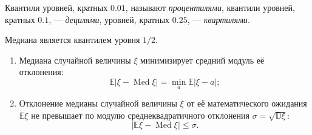 \begin{defn}
    Квантили уровней, кратных $0.01$, называют {\it процентилями}, квантили уровней, кратных $0.1$, — {\it децилями}, уровней, кратных $0.25$, — {\it квартилями}.
\end{defn} 

\begin{rmrk}
    Медиана является квантилем уровня $1 / 2$.
\end{rmrk} 

\begin{namedthm}\leavevmode
\begin{enumerate}
    \item Медиана случайной величины $\xi$ минимизирует средний модуль её отклонения:
    \begin{equation*}
        \mathbb{E}|\xi - \operatorname{Med} \xi| 
    = \min _{a} \mathbb{E}|\xi-a|;
    \end{equation*}
    \item Отклонение медианы случайной величины $\xi$ от её математического ожидания $\mathbb{E}\xi$ не превышает по модулю среднеквадратичного отклонения $\sigma = \sqrt{\mathbb{D}\xi}$:
    \begin{equation*}
        |\mathbb{E}\xi - \operatorname{Med}\xi| \leqslant \sigma.
    \end{equation*}
\end{enumerate}
\end{namedthm}

